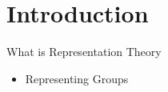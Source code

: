 
\section{Introduction}

\begin{frame}{What is Representation Theory}
    \begin{itemize}
        \item Representing Groups
    \end{itemize}
\end{frame}
